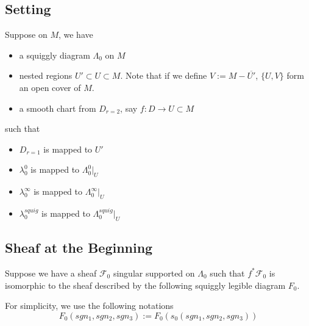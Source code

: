 \subsection{Setting}
Suppose on $M$, we have
\begin{itemize}
\item  a squiggly diagram $\Lambda_0$ on $M$

\item nested regions $U' \subset U \subset M$. Note that if we define $V:= M - \overline{U'}$, $\{U,V\}$ form an open cover of $M$.

\item a smooth chart from $D_{r=2}$, say $f: D  \rightarrow U \subset M$
\end{itemize}
such that 
\begin{itemize}
\item $D_{r=1}$ is mapped to $U'$ 

\item $\lambda_0^0$ is mapped to $\Lambda_0^0 |_{U}$

\item $\lambda_0^\infty$ is mapped to $\Lambda_0^\infty |_{U}$

\item $\lambda_0^{squig}$ is mapped to $\Lambda_0^{squig} |_{U}$
\end{itemize}

\subsection{Sheaf at the Beginning}
Suppose we have a sheaf $\mathscr{F}_0$ singular supported on $\Lambda_0$ such that $f^*\mathscr{F}_0$ is isomorphic to the sheaf described by the following squiggly legible diagram $F_0$.

For simplicity, we use the following notations
\[
F_0(sgn_1,sgn_2,sgn_3):= F_0(s_0(sgn_1,sgn_2,sgn_3))
\]

